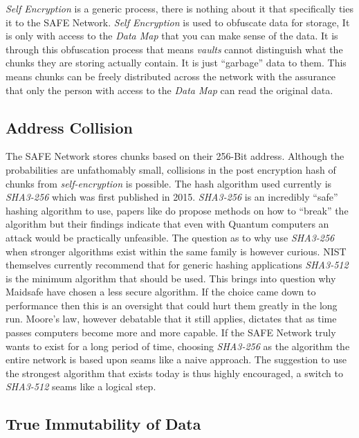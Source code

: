\textit{Self Encryption} is a generic process, there is nothing about it that specifically ties it to the SAFE Network. \textit{Self Encryption} is used to obfuscate data for storage, It is only with access to the \textit{Data Map} that you can make sense of the data. It is through this obfuscation process that means \textit{vaults} cannot distinguish what the chunks they are storing actually contain. It is just ``garbage'' data to them. This means chunks can be freely distributed across the network with the assurance that only the person with access to the \textit{Data Map} can read the original data.

\subsection{Address Collision}
\label{subsec:address-collision}

The SAFE Network stores chunks based on their 256-Bit address. Although the probabilities are unfathomably small, collisions in the post encryption hash of chunks from \textit{self-encryption} is possible. The hash algorithm used currently is \textit{SHA3-256}\cite{dworkin2015sha} which was first published in 2015. \textit{SHA3-256} is an incredibly ``safe'' hashing algorithm to use, papers like \cite{amy2016estimating} do propose methods on how to ``break'' the algorithm but their findings indicate that even with Quantum computers an attack would be practically unfeasible. The question as to why use \textit{SHA3-256} when stronger algorithms exist within the same family is however curious. NIST themselves currently recommend\cite{hash-reccomend} that for generic hashing applications \textit{SHA3-512} is the minimum algorithm that should be used. This brings into question why Maidsafe have chosen a less secure algorithm. If the choice came down to performance then this is an oversight that could hurt them greatly in the long run. Moore's law\cite{schaller1997moore}, however debatable that it still applies, dictates that as time passes computers become more and more capable. If the SAFE Network truly wants to exist for a long period of time, choosing \textit{SHA3-256} as the algorithm the entire network is based upon seams like a naive approach. The suggestion to use the strongest algorithm that exists today is thus highly encouraged, a switch to \textit{SHA3-512} seams like a logical step.

\subsection{True Immutability of Data}
\label{subsec:immutability-of-data}

